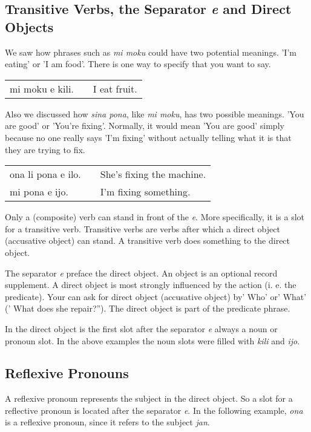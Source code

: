 \newpage

\subsection*{Transitive Verbs, the Separator \textit{e} and Direct Objects}
We saw how phrases such as \textit{mi moku} could have two potential meanings.
'I'm eating' or 'I am food'.
There is one way to specify that you want to say.

\begin{supertabular}{p{5,5cm}|ll}
    mi moku e kili. &  & I eat fruit. \\
\end{supertabular}

Also we discussed how \textit{sina pona}, like \textit{mi moku}, has two possible meanings.
'You are good' or 'You're fixing'.
Normally, it would mean 'You are good' simply because no one really says 'I'm fixing' without actually telling what it is that they are trying to fix.

\begin{supertabular}{p{5,5cm}|ll}
    ona li pona e ilo. &  & She's fixing the machine. \\
    mi pona e ijo.     &  & I'm fixing something.     \\
\end{supertabular}

Only a (composite) verb can stand in front of the \textit{e}.
More specifically, it is a slot for a transitive verb.
Transitive verbs are verbs after which a direct object (accusative object) can stand.
A transitive verb does something to the direct object.

The separator \textit{e} preface the direct object.
An object is an optional record supplement.
A direct object is most strongly influenced by the action (i. e. the predicate).
Your can ask for direct object (accusative object) by' Who' or' What' (' What does she repair?'').
The direct object is part of the predicate phrase.

In the direct object is the first slot after the separator \textit{e} always a noun or pronoun slot.
In the above examples the noun slots were filled with \textit{kili} and \textit{ijo}.

\subsection*{Reflexive Pronouns}
A reflexive pronoun represents the subject in the direct object.
So a slot for a reflective pronoun is located after the separator \textit{e}.
In the following example, \textit{ona} is a reflexive pronoun, since it refers to the subject \textit{jan}.

